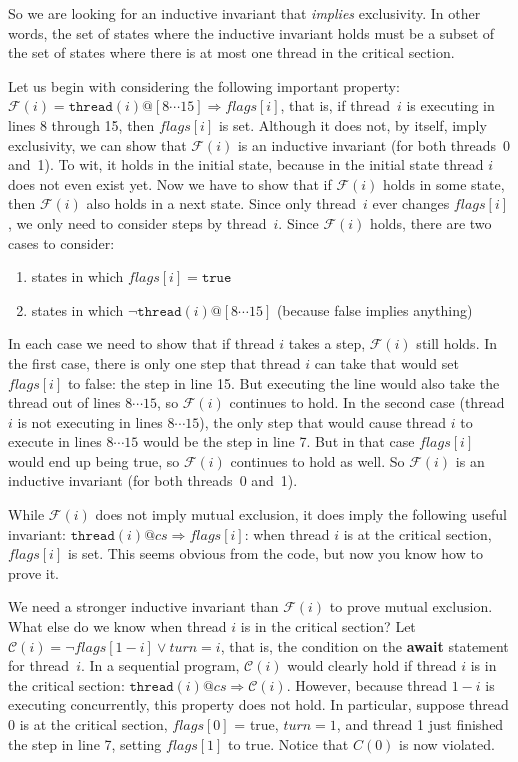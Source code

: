 \documentclass{report}
\begin{document}
So we are looking for an inductive invariant that \emph{implies} exclusivity.
In other words, the set of states where the inductive invariant holds
must be a subset of the set of states where there is at most one thread in
the critical section.

Let us begin with considering the following important property:
$\mathcal{F}(i) = \mathtt{thread}(i)@[8 \cdots 15] \Rightarrow \mathit{flags}[i]$,
that is, if thread~$i$ is executing in lines 8 through 15, then $\mathit{flags}[i]$
is set.
Although it does not, by itself, imply exclusivity, we can show that
$\mathcal{F}(i)$ is an inductive invariant (for both threads~0 and~1).
To wit, it holds in the initial state, because in the initial state thread $i$ does
not even exist yet.
Now we have to show that if $\mathcal{F}(i)$ holds in some state, then
$\mathcal{F}(i)$ also holds in a next state.
Since only thread~$i$ ever changes $\mathit{flags}[i]$, we only need to
consider steps by thread~$i$.
Since $\mathcal{F}(i)$ holds, there are two cases to consider:
\begin{enumerate}
\item states in which $\mathit{flags}[i] = \texttt{true}$
\item states in which $\lnot \mathtt{thread}(i)@[8 \cdots 15]$
(because false implies anything)
\end{enumerate}
In each case we need to show that if thread $i$ takes a step, 
$\mathcal{F}(i)$ still holds.
In the first case, there is only one step that thread $i$ can take that would
set $\mathit{flags}[i]$ to false: the step in line 15.  But executing the line
would also take the thread out of lines $8 \cdots 15$, so $\mathcal{F}(i)$ continues to hold.
In the second case (thread $i$ is not executing in lines $8 \cdots 15$), the only step
that would cause thread $i$ to execute in lines $8 \cdots 15$ would be the step in line 7.
But in that case $\mathit{flags}[i]$ would end up being true, so
$\mathcal{F}(i)$ continues to hold as well.
So $\mathcal{F}(i)$ is an inductive invariant (for both threads~0 and~1).

While $\mathcal{F}(i)$ does not imply mutual exclusion, it does imply the following useful
invariant: $\mathtt{thread}(i)@cs \Rightarrow \mathit{flags}[i]$: when thread $i$ is
at the critical section, $\mathit{flags}[i]$ is set.  This seems obvious from the code,
but now you know how to prove it.

We need a stronger inductive invariant than $\mathcal{F}(i)$ to prove mutual exclusion.
What else do we know when thread $i$ is in the critical section?
Let $\mathcal{C}(i) = \lnot\mathit{flags}[1 - i] \lor \mathit{turn} = i$, that is,
the condition on the \textbf{await} statement for thread~$i$.
In a sequential program, $\mathcal{C}(i)$ would clearly hold if thread $i$ is in
the critical section: $\mathtt{thread}(i)@cs \Rightarrow \mathcal{C}(i)$.
However, because thread $1-i$ is executing concurrently, this property does not
hold.  In particular, suppose thread 0 is at the critical section, $\mathit{flags}[0]$ = true,
$\mathit{turn} = 1$, and thread 1 just finished the step in line 7,
setting $\mathit{flags}[1]$ to true.  Notice that $C(0)$ is now violated.
\end{document}

